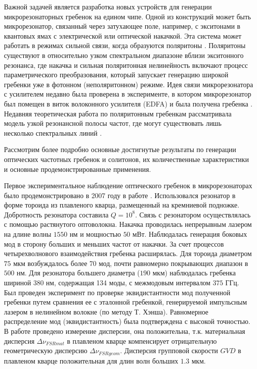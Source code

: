Важной задачей является разработка новых устройств для генерации микрорезонаторных гребенок на едином чипе. Одной из конструкций может быть микрорезонатор, связанный через затухающее поле, например, с экситонами в квантовых ямах с электрической или оптической накачкой. Эта система может работать в режимах сильной связи, когда образуются поляритоны \cite{Schneider2013}. Поляритоны существуют в относительно узком спектральном диапазоне вблизи экситонного резонанса, где накачка и сильная поляритонная нелинейность включают процесс параметрического преобразования, который запускает генерацию широкой гребенки уже в фотонном (неполяритонном) режиме. Идея связи микрорезонатора с усилителем недавно была проверена в эксперименте, в котором микрорезонатор был помещен в виток волоконного усилителя (EDFA) и была получена гребенка \cite{Johnson2014}. Недавняя теоретическая работа по поляритонным гребенкам рассматривала модель узкой резонансной полосы частот, где могут существовать лишь несколько спектральных линий \cite{Rayanov2015}.


Рассмотрим более подробно основные достигнутые результаты по генерации оптических частотных гребенок и солитонов, их количественные характеристики и основные продемонстрированные применения.

Первое экспериментальное наблюдение оптического гребенок в микрорезонаторах было продемонстрировано в 2007 году в работе \cite{DelHaye2007}. Использовался резонатор в форме тороида из плавленого кварца, размещенный на кремниевой подножке. Добротность резонатора составила $Q=10^8$. Связь с резонатором осуществлялась с помощью растянутого оптоволокна. Накачка проводилась непрерывным лазером на длине волны $1550$ нм и мощностью $50$ мВт. Наблюдалась генерация боковых мод в сторону больших и меньших частот от накачки. За счет процессов четырехволнового взаимодействия гребенка расширялась. Для тороида диаметром $75$ мкм возбуждалось более 70 мод, почти равномерно покрывающих диапазон в $500$ нм. Для резонатора большего диаметра ($190$ мкм) наблюдалась гребенка шириной $380$ нм, содержащая 134 моды, с межмодовым интервалом $375$ ГГц. Был проведен эксперимент по проверке эквидистантности мод полученной гребенки путем сравнения ее с эталонной гребенкой, генерируемой импульсным лазером в нелинейном волокне (по методу Т. Хэнша). Равномерное распределение мод (эквидистантность) была подтверждена с высокой точностью. В работе проведено измерение дисперсии, она положительна, т.к. материальная дисперсия $\Delta\nu_{FSRmat}$ в плавленом кварце компенсирует отрицательную геометрическую дисперсию $\Delta\nu_{FSRgeom}$. Дисперсия групповой скорости $GVD$ в плавленом кварце положительная для длин волн больших $1.3$ мкм.

